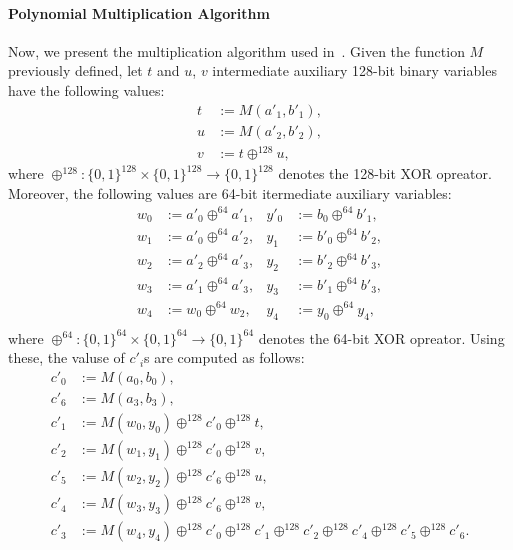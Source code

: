 \paragraph{Polynomial Multiplication Algorithm}
Now, we present the multiplication algorithm used in~\cite{libiop}. Given the function $M$ previously defined, let $t$ and $u$, $v$ intermediate auxiliary 128-bit binary variables have the following values:
\begin{align*}
	t &:= M(a'_1,b'_1), \\
	u &:= M(a'_2,b'_2), \\
	v &:= t \oplus^{128} u,
\end{align*}
where $\oplus^{128}:\{0,1\}^{128}\times\{0,1\}^{128} \rightarrow \{0,1\}^{128}$ denotes the 128-bit XOR opreator. Moreover, the following values are 64-bit itermediate auxiliary variables:
\begin{align*}
	w_0 &:= a'_0 \oplus^{64} a'_1,  &y'_0 &:= b_0 \oplus^{64} b'_1, \\
	w_1 &:= a'_0 \oplus^{64} a'_2,  &y_1 &:= b'_0 \oplus^{64} b'_2, \\
	w_2 &:= a'_2 \oplus^{64} a'_3,  &y_2 &:= b'_2 \oplus^{64} b'_3, \\
	w_3 &:= a'_1 \oplus^{64} a'_3,  &y_3 &:= b'_1 \oplus^{64} b'_3, \\
	w_4 &:= w_0 \oplus^{64} w_2,  &y_4 &:= y_0 \oplus^{64} y_4, \\
\end{align*}
where $\oplus^{64}:\{0,1\}^{64}\times\{0,1\}^{64} \rightarrow \{0,1\}^{64}$ denotes the 64-bit XOR opreator.
Using these, the valuse of $c'_i$s are computed as follows:
 \begin{align*}
 	c'_0 &:= M(a_0,b_0), \\
 	c'_6 &:= M(a_3,b_3), \\
 	c'_1 &:= M(w_0, y_0) \oplus^{128} c'_0 \oplus^{128} t, \\
 	c'_2 &:= M(w_1, y_1) \oplus^{128} c'_0 \oplus^{128} v, \\
 	c'_5 &:= M(w_2, y_2) \oplus^{128} c'_6 \oplus^{128} u, \\
 	c'_4 &:= M(w_3, y_3) \oplus^{128} c'_6 \oplus^{128} v, \\
 	c'_3 &:= M(w_4, y_4) \oplus^{128} c'_0 \oplus^{128} c'_1 \oplus^{128} c'_2 \oplus^{128} c'_4 \oplus^{128} c'_5 \oplus^{128} c'_6. \\
 \end{align*}
 

